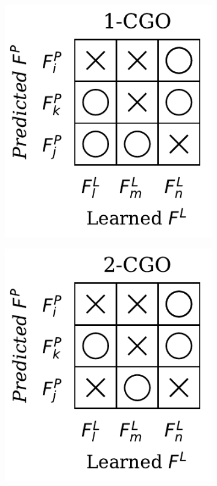 \begin{definition}[SO/GO in DiagVib-6]
\begin{figure}[H]
\begin{subfigure}[b]{0.17\textwidth}
            \includegraphics[width=\textwidth]{img/datasets/_1-CGO.pdf}
        \end{subfigure}
        \hfill
        \begin{subfigure}[b]{0.17\textwidth}
            \includegraphics[width=\textwidth]{img/datasets/_2-CGO.pdf}

\end{subfigure}
\end{figure}
\end{definition}
